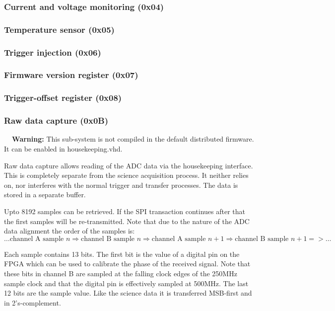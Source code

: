 \documentclass[a4paper,indent]{paper}
\newenvironment{warn}
{\par\begin{mdframed}[linewidth=2pt,linecolor=orange,backgroundcolor=orange!10]%
    \begin{list}{}{\leftmargin=0mm}\item[\bf\danger{}~~Warning: ]}
  {\end{list}\end{mdframed}\par}
\begin{document}
\subsubsection{Current and voltage monitoring (0x04)}

\subsubsection{Temperature sensor (0x05)}

\subsubsection{Trigger injection (0x06)}

\subsubsection{Firmware version register (0x07)}

\subsubsection{Trigger-offset register (0x08)}

\subsubsection{Raw data capture (0x0B)}

\begin{warn}
  This sub-system is not compiled in the default distributed firmware. It can be enabled in housekeeping.vhd.
\end{warn}

Raw data capture allows reading of the ADC data via the housekeeping interface.
This is completely separate from the science acquisition process.
It neither relies on, nor interferes with the normal trigger and transfer processes.
The data is stored in a separate buffer.

Upto 8192 samples can be retrieved. If the \ac{SPI} transaction continues after that the first samples will be re-transmitted. Note that due to the nature of the \ac{ADC} data alignment the order of the samples is:
$$
\ldots \text{channel A sample } n \Rightarrow \text{channel B sample } n \Rightarrow \text{channel A sample } n+1 \Rightarrow \text{channel B sample } n+1 => \ldots
$$

Each sample contains 13 bits. The first bit is the value of a digital pin on the \ac{FPGA} which can be used to calibrate the phase of the received signal. Note that these bits in channel B are sampled at the falling clock edges of the 250MHz sample clock and that the digital pin is effectively sampled at 500MHz. The last 12 bits are the sample value. Like the science data it is transferred MSB-first and in 2's-complement. 
\end{document}
